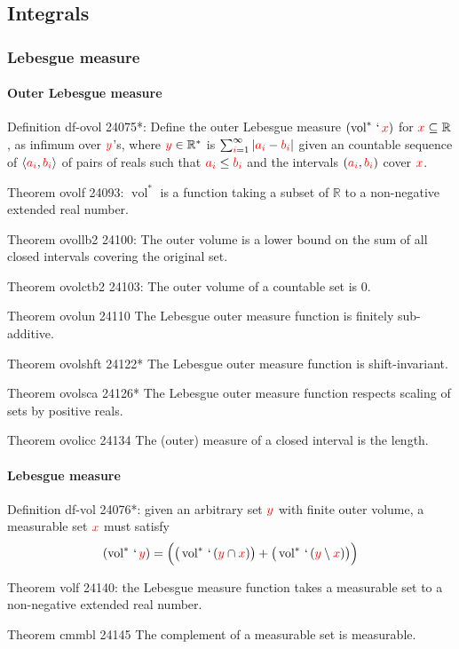\documentclass[12pt, letterpaper]{article}
\newcommand{\re}{\mathbb{R}}
\newcommand{\xr}{\mathbb{R}^*}
\newcommand{\inters}[2][]{
	\ifthenelse { \equal {#1} {} }
	{ \bigcap{#2} } %
	{ {#1}\cap{#2} } %
}
\newcommand{\ovol}{\operatorname{vol}^*}
\newcommand{\red}[1]{{\color{red} #1}}
\newcommand{\dif}{\setminus}
\newcommand{\setvar}{\red}
\newcommand{\sa}{\setvar{a}}
\newcommand{\sbb}{\setvar{b}}
\newcommand{\si}{\setvar{i}}
\newcommand{\sx}{\setvar{x}}
\newcommand{\sy}{\setvar{y}}
\newcommand{\at}{\,`\,}
\newcommand{\opair}[2]{\left\langle{{#1},{#2}}\right\rangle}
\theoremstyle{definition}
\theoremstyle{remark}
\theoremstyle{definition}
\theoremstyle{plain}
\begin{document}
	\subsection{Integrals}
	\subsubsection{Lebesgue measure}
	
	\paragraph{Outer Lebesgue measure}
	Definition	df-ovol 24075*: Define the outer Lebesgue measure $(\ovol\at\sx)$ for $\sx\subseteq\re$, as infimum over $\sy$'s, where $\sy\in\xr$ is $\sum_{\si=1}^{\infty}|\sa_\si-\sbb_\si|$
	given an countable sequence of $\opair{\sa_\si}{\sbb_\si}$ of pairs of reals such that $\sa_\si\le\sbb_\si$ and the intervals $(\sa_\si,\sbb_\si)$ cover $\sx$.
	
	Theorem	ovolf 24093: $\ovol$ is a function taking a subset of $\re$ to a non-negative extended real number.
	
	Theorem	ovollb2 24100: The outer volume is a lower bound on the sum of all closed intervals covering the original set.
	
	Theorem	ovolctb2 24103:	The outer volume of a countable set is 0.
	
	Theorem	ovolun 24110	The Lebesgue outer measure function is finitely sub-additive.

	
	Theorem	ovolshft 24122*	The Lebesgue outer measure function is shift-invariant.
	
	Theorem	ovolsca 24126*	The Lebesgue outer measure function respects scaling of sets by positive reals.
	
	Theorem	ovolicc 24134	The (outer) measure of a closed interval is the length.
	
	
	\paragraph{Lebesgue measure}
	Definition	df-vol 24076*: given an arbitrary set $\sy$ with finite outer volume, a measurable set $\sx$ must satisfy
	\[ (\ovol\at\sy) =\Big( \big(\ovol\at(\inters[\sy]{\sx})\big) +\big(\ovol\at({\sy}\dif{\sx})\big)\Big) \]
	
	
	Theorem	volf 24140: the Lebesgue measure function takes a measurable set to a non-negative extended real number.
	
	Theorem	cmmbl 24145	The complement of a measurable set is measurable.
	
\end{document}
